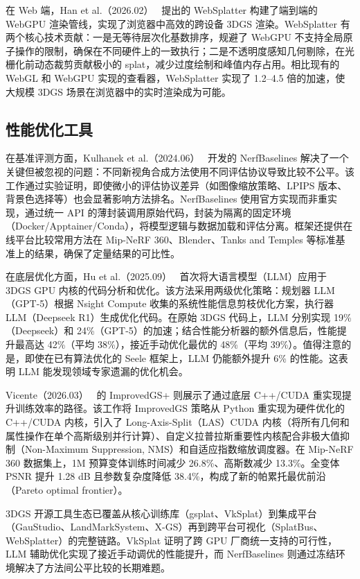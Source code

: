 在 Web 端，Han et al.（2026.02）~\cite{2602_03207} 提出的 WebSplatter 构建了端到端的 WebGPU 渲染管线，实现了浏览器中高效的跨设备 3DGS 渲染。WebSplatter 有两个核心技术贡献：一是无等待层次化基数排序，规避了 WebGPU 不支持全局原子操作的限制，确保在不同硬件上的一致执行；二是不透明度感知几何剔除，在光栅化前动态裁剪贡献极小的 splat，减少过度绘制和峰值内存占用。相比现有的 WebGL 和 WebGPU 实现的查看器，WebSplatter 实现了 1.2--4.5 倍的加速，使大规模 3DGS 场景在浏览器中的实时渲染成为可能。

\subsection{性能优化工具}

在基准评测方面，Kulhanek et al.（2024.06）~\cite{2406_17345} 开发的 NerfBaselines 解决了一个关键但被忽视的问题：不同新视角合成方法使用不同评估协议导致比较不公平。该工作通过实验证明，即使微小的评估协议差异（如图像缩放策略、LPIPS 版本、背景色选择等）也会显著影响方法排名。NerfBaselines 使用官方实现而非重实现，通过统一 API 的薄封装调用原始代码，封装为隔离的固定环境（Docker/Apptainer/Conda），将模型逻辑与数据加载和评估分离。框架还提供在线平台比较常用方法在 Mip-NeRF 360、Blender、Tanks and Temples 等标准基准上的结果，确保了定量结果的可比性。

在底层优化方面，Hu et al.（2025.09）~\cite{2509_25626} 首次将大语言模型（LLM）应用于 3DGS GPU 内核的代码分析和优化。该方法采用两级优化策略：规划器 LLM（GPT-5）根据 Nsight Compute 收集的系统性能信息剪枝优化方案，执行器 LLM（Deepseek R1）生成优化代码。在原始 3DGS 代码上，LLM 分别实现 19\%（Deepseek）和 24\%（GPT-5）的加速；结合性能分析器的额外信息后，性能提升最高达 42\%（平均 38\%），接近手动优化最优的 48\%（平均 39\%）。值得注意的是，即使在已有算法优化的 Seele 框架上，LLM 仍能额外提升 6\% 的性能。这表明 LLM 能发现领域专家遗漏的优化机会。

Vicente（2026.03）~\cite{2603_08661} 的 ImprovedGS+ 则展示了通过底层 C++/CUDA 重实现提升训练效率的路径。该工作将 ImprovedGS 策略从 Python 重实现为硬件优化的 C++/CUDA 内核，引入了 Long-Axis-Split（LAS）CUDA 内核（将所有几何和属性操作在单个高斯级别并行计算）、自定义拉普拉斯重要性内核配合非极大值抑制（Non-Maximum Suppression, NMS）和自适应指数缩放调度器。在 Mip-NeRF 360 数据集上，1M 预算变体训练时间减少 26.8\%、高斯数减少 13.3\%。全变体 PSNR 提升 1.28 dB 且参数复杂度降低 38.4\%，构成了新的帕累托最优前沿（Pareto optimal frontier）。

\begin{takeaway}
3DGS 开源工具生态已覆盖从核心训练库（gsplat、VkSplat）到集成平台（GauStudio、LandMarkSystem、X-GS）再到跨平台可视化（SplatBus、WebSplatter）的完整链路。VkSplat 证明了跨 GPU 厂商统一支持的可行性，LLM 辅助优化实现了接近手动调优的性能提升，而 NerfBaselines 则通过冻结环境解决了方法间公平比较的长期难题。
\end{takeaway}


